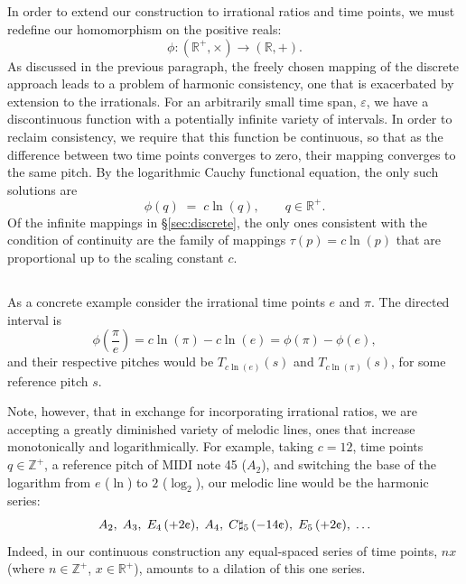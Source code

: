 \documentclass[11pt]{article}
\theoremstyle{plain}
\theoremstyle{definition}
\theoremstyle{remark}
\begin{document}
\subsection{}
\label{sec:3.2}

In order to extend our construction to irrational ratios and time points, we must redefine our homomorphism on the positive reals:
\begin{equation}
  \phi \colon (\mathbb{R}^{+}, \times) \longrightarrow (\mathbb{R}, +).
  \label{eq:hom-continuous}
\end{equation}
As discussed in the previous paragraph, the freely chosen mapping of the discrete approach leads to a problem of harmonic consistency, one that is exacerbated by extension to the irrationals. For an arbitrarily small time span, $\varepsilon$, we have a discontinuous function with a potentially infinite variety of intervals. In order to reclaim consistency, we require that this function be continuous, so that as the difference between two time points converges to zero, their mapping converges to the same pitch. By the logarithmic Cauchy functional equation, the only such solutions are
\begin{equation}
  \phi(q) \;=\; c \ln(q), \qquad q \in \mathbb{R}^{+}.
  \label{eq:cauchy}
\end{equation}
Of the infinite mappings in \S\ref{sec:discrete}, the only ones consistent with the condition of continuity are the family of mappings $\tau(p) = c \ln(p)$ that are proportional up to the scaling constant $c$.

\subsection{}
\label{sec:3.3}

As a concrete example consider the irrational time points $e$ and $\pi$. The directed interval is
\[
  \phi\!\left(\frac{\pi}{e}\right) = c \ln(\pi) - c \ln(e) = \phi(\pi) - \phi(e),
\]
and their respective pitches would be $T_{c \ln(e)}(s)$ and $T_{c \ln(\pi)}(s)$, for some reference pitch $s$.

Note, however, that in exchange for incorporating irrational ratios, we are accepting a greatly diminished variety of melodic lines, ones that increase monotonically and logarithmically. For example, taking $c = 12$, time points $q \in \mathbb{Z}^{+}$, a reference pitch of MIDI note 45 ($A_2$), and switching the base of the logarithm from $e$ ($\ln$) to $2$ ($\log_2$), our melodic line would be the harmonic series:
\[
  A_2,\; A_3,\; E_4\,(+2\text{\textcent)},\; A_4,\; C\sharp_5\,(-14\text{\textcent)},\; E_5\,(+2\text{\textcent}),\; \ldots
\]
Indeed, in our continuous construction any equal-spaced series of time points, $nx$ (where $n \in \mathbb{Z}^{+}$, $x \in \mathbb{R}^{+}$), amounts to a dilation of this one series.
\end{document}
